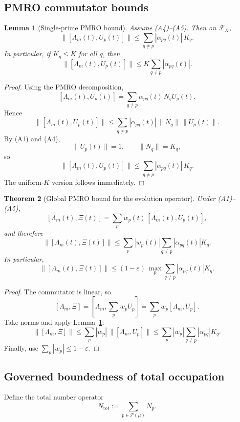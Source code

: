 \documentclass[11pt,a4paper]{article}
\theoremstyle{plain}
\newtheorem{theorem}{Theorem}[section]
\newtheorem{lemma}[theorem]{Lemma}
\theoremstyle{definition}
\theoremstyle{remark}
\begin{document}
\subsection{PMRO commutator bounds}

\begin{lemma}[Single-prime PMRO bound]
\label{lem:pmro_single}
Assume \textup{(A4)}--\textup{(A5)}. Then on \(\mathcal F_K\),
\[
\|[\Lambda_m(t),U_p(t)]\|
\le
\sum_{q\ne p} |\alpha_{pq}(t)|\,K_q.
\]
In particular, if \(K_q\le K\) for all \(q\), then
\[
\|[\Lambda_m(t),U_p(t)]\|
\le
K\sum_{q\ne p} |\alpha_{pq}(t)|.
\]
\end{lemma}

\begin{proof}
Using the PMRO decomposition,
\[
[\Lambda_m(t),U_p(t)]
=
\sum_{q\ne p}\alpha_{pq}(t)\,N_qU_p(t).
\]
Hence
\[
\|[\Lambda_m(t),U_p(t)]\|
\le
\sum_{q\ne p} |\alpha_{pq}(t)|\,\|N_q\|\,\|U_p(t)\|.
\]
By \textup{(A1)} and \textup{(A4)},
\[
\|U_p(t)\|=1,
\qquad
\|N_q\|=K_q,
\]
so
\[
\|[\Lambda_m(t),U_p(t)]\|
\le
\sum_{q\ne p} |\alpha_{pq}(t)|\,K_q.
\]
The uniform-\(K\) version follows immediately.
\end{proof}

\begin{theorem}[Global PMRO bound for the evolution operator]
\label{thm:pmro_global}
Under \textup{(A1)}--\textup{(A5)},
\[
[\Lambda_m(t),\Xi(t)]
=
\sum_{p} w_p(t)\,[\Lambda_m(t),U_p(t)],
\]
and therefore
\[
\|[\Lambda_m(t),\Xi(t)]\|
\le
\sum_p |w_p(t)| \sum_{q\ne p} |\alpha_{pq}(t)|K_q.
\]
In particular,
\[
\|[\Lambda_m(t),\Xi(t)]\|
\le
(1-\varepsilon)\,
\max_{p}
\sum_{q\ne p} |\alpha_{pq}(t)|K_q.
\]
\end{theorem}

\begin{proof}
The commutator is linear, so
\[
[\Lambda_m,\Xi]
=
\left[\Lambda_m,\sum_p w_pU_p\right]
=
\sum_p w_p[\Lambda_m,U_p].
\]
Take norms and apply Lemma~\ref{lem:pmro_single}:
\[
\|[\Lambda_m,\Xi]\|
\le
\sum_p |w_p|\,\|[\Lambda_m,U_p]\|
\le
\sum_p |w_p|
\sum_{q\ne p} |\alpha_{pq}|K_q.
\]
Finally, use \(\sum_p |w_p|\le 1-\varepsilon\).
\end{proof}

\subsection{Governed boundedness of total occupation}

Define the total number operator
\[
N_{\mathrm{tot}} := \sum_{p\in\mathcal P(\mu)} N_p.
\]
\end{document}
